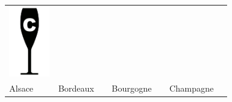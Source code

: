 {\begin{center}
\begin{tabular}{ >{\centering\arraybackslash}p{0.18\linewidth}  >{\centering\arraybackslash}p{0.18\linewidth}  >{\centering\arraybackslash}p{0.18\linewidth}  >{\centering\arraybackslash}p{0.18\linewidth}}
\includegraphics[scale=0.021, trim= 0em -5em -5em -5em,]{Icones/icon_champagne_black.pdf}
\\
	Alsace  & Bordeaux & Bourgogne & Champagne \\
\end{tabular}
\end{center}
}	
